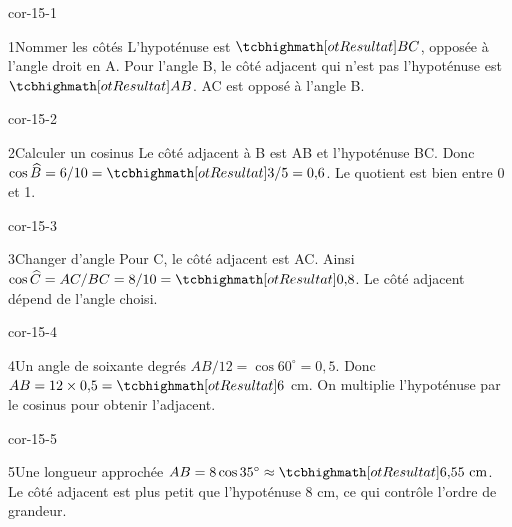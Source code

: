 \clearpage\pagestyle{otMain}\setlength{\otBlocEspacement}{2.5mm}\fontsize{11}{15}\selectfont{}
\begin{blocLivre}{cor-15-1}\begin{corrige}{1}{Nommer les côtés}
L’hypoténuse est $\res{BC}$, opposée à l’angle droit en A. Pour l’angle B, le côté adjacent qui n’est pas l’hypoténuse est $\res{AB}$. AC est opposé à l’angle B.
\label{fig-cor-15-1}
\end{corrige}\end{blocLivre}
\begin{blocLivre}{cor-15-2}\begin{corrige}{2}{Calculer un cosinus}
Le côté adjacent à B est AB et l’hypoténuse BC. Donc $\cos\widehat B=6/10=\res{3/5=0{,}6}$. Le quotient est bien entre 0 et 1.
\label{fig-cor-15-2}
\end{corrige}\end{blocLivre}
\begin{blocLivre}{cor-15-3}\begin{corrige}{3}{Changer d’angle}
Pour C, le côté adjacent est AC. Ainsi $\cos\widehat C=AC/BC=8/10=\res{0{,}8}$. Le côté adjacent dépend de l’angle choisi.
\label{fig-cor-15-3}
\end{corrige}\end{blocLivre}
\begin{blocLivre}{cor-15-4}\begin{corrige}{4}{Un angle de soixante degrés}
$AB/12=\cos60^\circ=0{,}5$. Donc $AB=12\times0{,}5=\res6$ cm. On multiplie l’hypoténuse par le cosinus pour obtenir l’adjacent.
\label{fig-cor-15-4}
\end{corrige}\end{blocLivre}
\begin{blocLivre}{cor-15-5}\begin{corrige}{5}{Une longueur approchée}
$AB=8\cos35^\circ\approx\res{6{,}55\ \mathrm{cm}}$. Le côté adjacent est plus petit que l’hypoténuse 8 cm, ce qui contrôle l’ordre de grandeur.
\label{fig-cor-15-5}
\end{corrige}\end{blocLivre}
